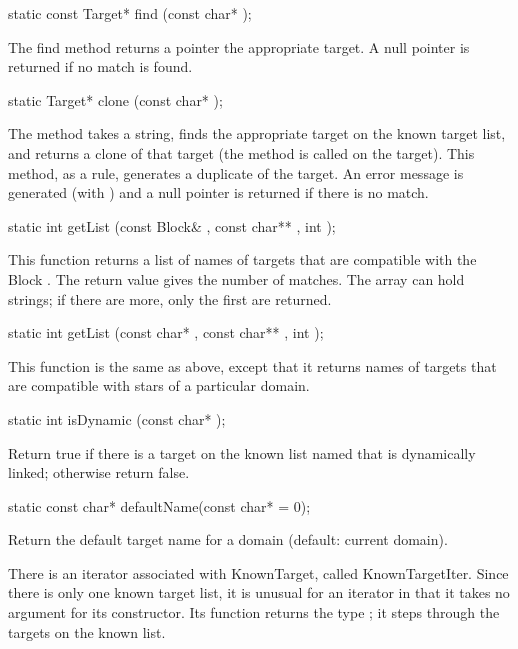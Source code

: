 \begin{example}
static const Target* find (const char* );
\end{example}

The find method returns a pointer the appropriate target.
A null pointer is returned if no match
is found.

\begin{example}
static Target* clone (const char* );
\end{example}

The  method takes a string, finds the appropriate target on
the known target list, and returns a clone of that target (the
 method is called on the target).  This method, as
a rule, generates a duplicate of the target.
An error message is generated (with ) and
a null pointer is returned if there is no match.

\begin{example}
static int getList (const Block& , const char** , int );
\end{example}

This function returns a list of names of targets that are compatible
with the Block .  The return value gives the number of matches.
The  array can hold  strings; if there are more,
only the first  are returned.

\begin{example}
static int getList (const char* , const char** , int );
\end{example}

This function is the same as above, except that it returns names of
targets that are compatible with stars of a particular domain.

\begin{example}
static int isDynamic (const char* );
\end{example}

Return true if there is a target on the known list named 
that is dynamically linked; otherwise return false.

\begin{example}
static const char* defaultName(const char*  = 0);
\end{example}

Return the default target name for a domain (default: current domain).

There is an iterator associated with KnownTarget, called
KnownTargetIter.  Since there is only one known target list, it is
unusual for an iterator in that it takes no argument for its constructor.
Its  function returns the type ; it
steps through the targets on the known list.

